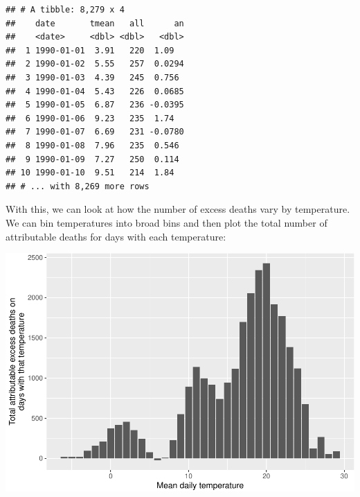 \documentclass[
]{book}
\newenvironment{Shaded}{\begin{snugshade}}{\end{snugshade}}
\newcommand{\CharTok}[1]{\textcolor[rgb]{0.31,0.60,0.02}{#1}}
\newcommand{\DataTypeTok}[1]{\textcolor[rgb]{0.13,0.29,0.53}{#1}}
\newcommand{\KeywordTok}[1]{\textcolor[rgb]{0.13,0.29,0.53}{\textbf{#1}}}
\newcommand{\NormalTok}[1]{#1}
\newcommand{\OperatorTok}[1]{\textcolor[rgb]{0.81,0.36,0.00}{\textbf{#1}}}
\newcommand{\StringTok}[1]{\textcolor[rgb]{0.31,0.60,0.02}{#1}}
\begin{document}
\begin{verbatim}
## # A tibble: 8,279 x 4
##    date       tmean   all      an
##    <date>     <dbl> <dbl>   <dbl>
##  1 1990-01-01  3.91   220  1.09  
##  2 1990-01-02  5.55   257  0.0294
##  3 1990-01-03  4.39   245  0.756 
##  4 1990-01-04  5.43   226  0.0685
##  5 1990-01-05  6.87   236 -0.0395
##  6 1990-01-06  9.23   235  1.74  
##  7 1990-01-07  6.69   231 -0.0780
##  8 1990-01-08  7.96   235  0.546 
##  9 1990-01-09  7.27   250  0.114 
## 10 1990-01-10  9.51   214  1.84  
## # ... with 8,269 more rows
\end{verbatim}

With this, we can look at how the number of excess deaths vary by temperature. We can bin temperatures into broad bins and then plot the total number of attributable deaths for days with each temperature:

\begin{Shaded}
\end{Shaded}

\includegraphics{adv_epi_analysis_files/figure-latex/unnamed-chunk-159-1.pdf}
\end{document}
